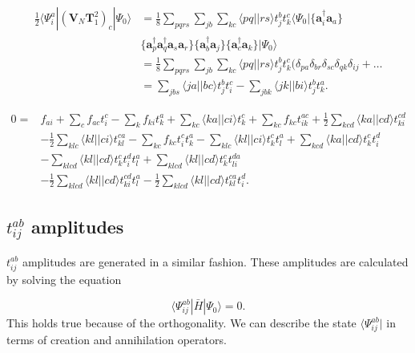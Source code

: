 \documentclass[graybox,sectrefs,envcountresetchap,open=right]{svmonodo}
\begin{document}
\begin{align}
\frac{1}{2} \langle \Psi_i^a | (\mathbf{V}_N \mathbf{T}_1^2)_c | \Psi_0 \rangle &
= \frac{1}{8} \sum_{pqrs} \sum_{jb} \sum_{kc} 
\langle pq || rs \rangle t_j^b t_k^c \langle \Psi_0 | 
\{ \mathbf{a}^{\dagger}_i \mathbf{a}_a \} \nonumber \\ &
\{\mathbf{a}^{\dagger}_p \mathbf{a}^{\dagger}_q
\mathbf{a}_s \mathbf{a}_r \} \{\mathbf{a}^{\dagger}_b \mathbf{a}_j \} \{\mathbf{a}^{\dagger}_c \mathbf{a}_k \}
| \Psi_0 \rangle \nonumber \\ &
= \frac{1}{8} \sum_{pqrs} \sum_{jb} \sum_{kc} 
\langle pq || rs \rangle t_j^b t_k^c (
\delta_{pa} \delta_{br} \delta_{sc} \delta_{qk} \delta_{ij} + \dots \nonumber \\ & 
= \sum_{jbs} \langle ja || bc \rangle t_j^b t_i^c
- \sum_{jbk} \langle jk || bi \rangle t_j^b t_k^a .
\end{align} 

\begin{align}
0 = & f_{ai} + \sum_c f_{ac} t_i^c - \sum_k f_{ki} t_k^a + \sum_{kc} \langle ka||ci \rangle t_k^c + \sum_{kc} f_{kc} t_{ik}^{ac} + \frac{1}{2} \sum_{kcd} \langle ka || cd \rangle t_{ki}^{cd} \label{T1equation} \\ &
- \frac{1}{2} \sum_{klc} \langle kl||ci\rangle t_{kl}^{ca} - \sum_{kc} f_{kc} t_i^c t_k^a - \sum_{klc} \langle kl || ci \rangle t_k^c t_l^a + \sum_{kcd} \langle ka||cd \rangle t_k^c t_i^d \nonumber \\ & 
- \sum_{klcd} \langle kl || cd \rangle t_k^c t_i^d t_l^a + \sum_{klcd} \langle kl||cd\rangle t_k^c t_{li}^{da} \nonumber \\ &
 - \frac{1}{2} \sum_{klcd} \langle kl || cd \rangle t_{ki}^{cd} t_l^a 
- \frac{1}{2} \sum_{klcd} \langle kl||cd \rangle t_{kl}^{ca} t_i^d . \nonumber
\end{align} 

\subsection{$t_{ij}^{ab}$ amplitudes}
$t_{ij}^{ab}$ amplitudes are generated in a similar fashion. These amplitudes are calculated by solving the equation

\begin{equation}
\langle \Psi_{ij}^{ab} | \bar{H} | \Psi_0 \rangle = 0 . \label{T2equationtosolve}
\end{equation} 
This holds true because of the orthogonality. We can describe the state $\langle \Psi_{ij}^{ab}|$ in terms of creation and annihilation operators.
\end{document}
